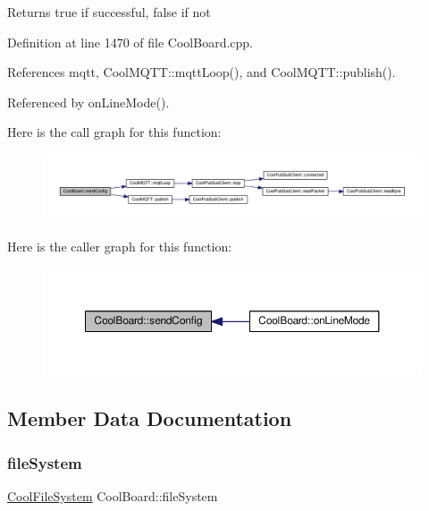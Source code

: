 \begin{DoxyReturn}{Returns}
true if successful, false if not 
\end{DoxyReturn}


Definition at line 1470 of file Cool\+Board.\+cpp.



References mqtt, Cool\+M\+Q\+T\+T\+::mqtt\+Loop(), and Cool\+M\+Q\+T\+T\+::publish().



Referenced by on\+Line\+Mode().

Here is the call graph for this function\+:\nopagebreak
\begin{figure}[H]
\begin{center}
\leavevmode
\includegraphics[width=350pt]{d7/df9/class_cool_board_a705398b11560603fcdd1b9e8e95d0027_cgraph}
\end{center}
\end{figure}
Here is the caller graph for this function\+:\nopagebreak
\begin{figure}[H]
\begin{center}
\leavevmode
\includegraphics[width=350pt]{d7/df9/class_cool_board_a705398b11560603fcdd1b9e8e95d0027_icgraph}
\end{center}
\end{figure}


\subsection{Member Data Documentation}
\mbox{\label{class_cool_board_a42c2586fbb13ff7f06538e9284e8538d}} 
\subsubsection{\texorpdfstring{file\+System}{fileSystem}}
{\footnotesize\ttfamily \hyperlink{class_cool_file_system}{Cool\+File\+System} Cool\+Board\+::file\+System\hspace{0.3cm}{\ttfamily [private]}}

